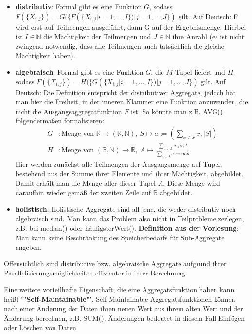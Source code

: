 \begin{itemize}
	\item \textbf{distributiv}: Formal gibt es eine Funktion \(G\), sodass \(F(\{X_{i,j}\}) = G(\{F(\{X_{i,j}| i = 1, ..., I\}) | j = 1, ..., J\})\) gilt. Auf Deutsch: F wird erst auf Teilmengen ausgeführt, dann G auf der Ergebnismenge. Hierbei ist \(I \in \mathbb{N}\) die Mächtigkeit der Teilmengen und \(J\in\mathbb{N}\) ihre Anzahl (es ist nicht zwingend notwendig, dass alle Teilmengen auch tatsächlich die gleiche Mächtigkeit haben).
	\item \textbf{algebraisch}: Formal gibt es eine Funktion \(G\), die \(M\)-Tupel liefert und \(H\), sodass \(F(\{X_{i,j}\}) = H(\{G(\{X_{i,j}| i = 1, ..., I\}) | j = 1, ..., J\})\) gilt. Auf Deutsch: Die Definition entspricht der distributiver Aggregate, jedoch hat man hier die Freiheit, in der inneren Klammer eine Funktion anzuwenden, die nicht die Ausgangsaggregatfunktion \(F\) ist. So könnte man z.B. AVG() folgendermaßen formalisieren:
	\begin{align*}
		G &: \text{Menge von } \mathbb{R} \rightarrow (\mathbb{R},\mathbb{N}),\ S \mapsto a:= (\sum_{x\in S} x, |S|) \\
		H &: \text{Menge von } (\mathbb{R},\mathbb{N}) \rightarrow \mathbb{R},\ A \mapsto \frac{\sum\nolimits_{a\in A} a.first}{\sum\nolimits_{a\in A}a.second}
	\end{align*}
        Hier werden zunächst alle Teilmengen der Ausgangsmenge auf Tupel,
        bestehend aus der Summe ihrer Elemente und ihrer Mächtigkeit,
        abgebildet. Damit erhält man die Menge aller dieser Tupel \(A\). Diese
        Menge wird daraufhin wieder gemäß der zweiten Zeile auf \(\mathbb{R}\)
        abgebildet.
	\item \textbf{holistisch}: Holistische Aggregate sind all jene, die weder distributiv noch algebraisch sind. Man kann das Problem also nicht in Teilprobleme zerlegen, z.B. bei median() oder häufigsterWert(). \textbf{Definition aus der Vorlesung}: Man kann keine Beschränkung des Speicherbedarfs für Sub-Aggregate angeben.
\end{itemize}
Offensichtlich sind distributive bzw. algebraische Aggregate aufgrund ihrer Parallelisierungsmöglichkeiten effizienter in ihrer Berechnung.

\noindent Eine weitere vorteilhafte Eigenschaft, die eine Aggregatsfunktion haben kann, heißt \textbf{"'Self-Maintainable"'}. Self-Maintainable Aggregatsfunktionen können nach einer Änderung der Daten ihren neuen Wert aus ihrem alten Wert und der Änderung berechnen, z.B. SUM(). Änderungen bedeutet in diesem Fall Einfügen oder Löschen von Daten.

